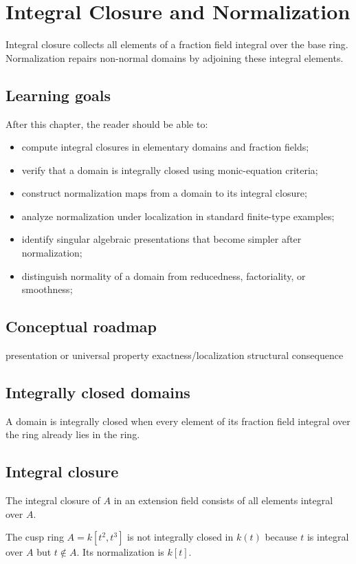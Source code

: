 \chapter{Integral Closure and Normalization}
\label{ch:v20}

Integral closure collects all elements of a fraction field integral over the base ring. Normalization repairs non-normal domains by adjoining these integral elements.

\section*{Learning goals}
After this chapter, the reader should be able to:
\begin{itemize}
\item compute integral closures in elementary domains and fraction fields;
\item verify that a domain is integrally closed using monic-equation criteria;
\item construct normalization maps from a domain to its integral closure;
\item analyze normalization under localization in standard finite-type examples;
\item identify singular algebraic presentations that become simpler after normalization;
\item distinguish normality of a domain from reducedness, factoriality, or smoothness;
\end{itemize}
\section*{Conceptual roadmap}
\volroadmap
  {presentation or universal property}
  {exactness/localization}
  {structural consequence}

\section{Integrally closed domains}
A domain is integrally closed when every element of its fraction field integral over the ring already lies in the ring.

\section{Integral closure}
The integral closure of $A$ in an extension field consists of all elements integral over $A$.

\begin{example}\label{ex:v20-expand-01}
The cusp ring $A=k[t^2,t^3]$ is not integrally closed in $k(t)$ because $t$ is integral over $A$ but $t\notin A$. Its normalization is $k[t]$.
\end{example}
